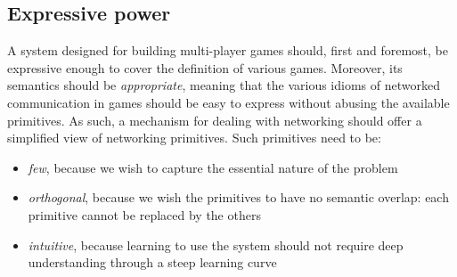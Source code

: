 \subsection{Expressive power}
A system designed for building multi-player games should, first and foremost, be expressive enough to cover the definition of various games. Moreover, its semantics should be \textit{appropriate}, meaning that the various idioms of networked communication in games should be easy to express without abusing the available primitives. As such, a mechanism for dealing with networking should offer a simplified view of networking primitives. Such primitives need to be:
\begin{itemize}
\item \textit{few}, because we wish to capture the essential nature of the problem
\item \textit{orthogonal}, because we wish the primitives to have no semantic overlap: each primitive cannot be replaced by the others
\item \textit{intuitive}, because learning to use the system should not require deep understanding through a steep learning curve
\end{itemize}
